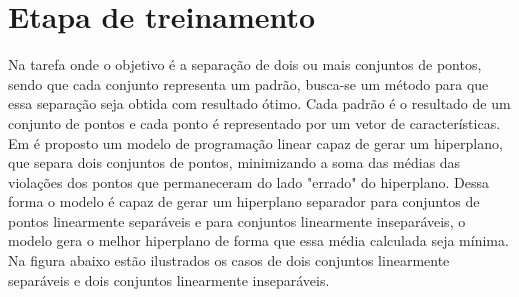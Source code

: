 \section{Etapa de treinamento}
Na tarefa onde o objetivo é a separação de dois ou mais conjuntos de pontos, sendo que cada conjunto representa um padrão, busca-se um método para que essa separação seja obtida com resultado ótimo. Cada padrão é o resultado de um conjunto de pontos e cada ponto é representado por um vetor de características.
Em \cite{Bennett92robustlinear} é proposto um modelo de programação linear capaz de gerar um hiperplano, que separa dois conjuntos de pontos, minimizando a soma das médias das violações dos pontos que permaneceram do lado "errado" do hiperplano. Dessa forma o modelo é capaz de gerar um hiperplano separador para conjuntos de pontos linearmente separáveis e para conjuntos linearmente inseparáveis, o modelo gera o melhor hiperplano de forma que essa média calculada seja mínima. Na figura abaixo estão ilustrados os casos de dois conjuntos linearmente separáveis e dois conjuntos linearmente inseparáveis.
 
